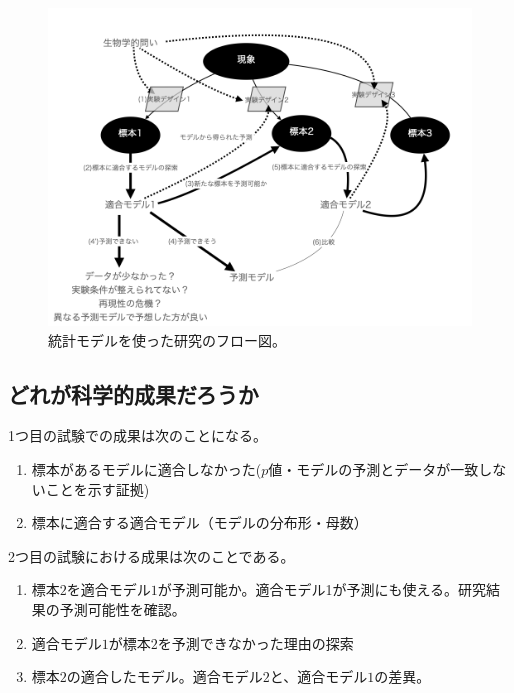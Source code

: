 \begin{figure}
    \begin{center}
        \includegraphics[width=15cm]{./image/01_/conceptual_diagram/conceptual_diagram.006.png}
        \caption{統計モデルを使った研究のフロー図。}
        \label{fig:conceptual_diagram_statistics_research}
    \end{center}
\end{figure}

\subsection{どれが科学的成果だろうか}
1つ目の試験での成果は次のことになる。
\begin{enumerate}
    \item 標本があるモデルに適合しなかった($p$値・モデルの予測とデータが一致しないことを示す証拠)
    \item 標本に適合する適合モデル（モデルの分布形・母数）
\end{enumerate}

2つ目の試験における成果は次のことである。
\begin{enumerate}
    \item 標本$2$を適合モデル$1$が予測可能か。適合モデル1が予測にも使える。研究結果の予測可能性を確認。
    \item 適合モデル$1$が標本$2$を予測できなかった理由の探索
    \item 標本$2$の適合したモデル。適合モデル$2$と、適合モデル$1$の差異。
\end{enumerate}



